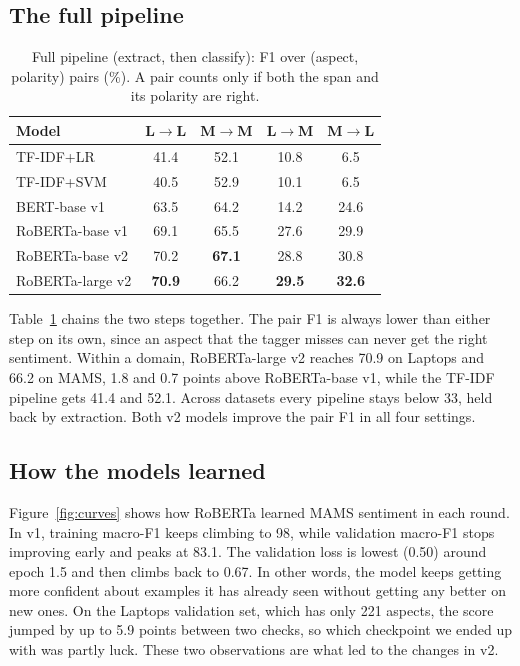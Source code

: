 \documentclass[11pt]{article}
\begin{document}
\subsection{The full pipeline}
\begin{table}[t]
\centering
\footnotesize
\begin{tabular}{lcccc}
\toprule
Model & L$\to$L & M$\to$M & L$\to$M & M$\to$L \\
\midrule
TF-IDF+LR & 41.4 & 52.1 & 10.8 & 6.5 \\
TF-IDF+SVM & 40.5 & 52.9 & 10.1 & 6.5 \\
BERT-base v1 & 63.5 & 64.2 & 14.2 & 24.6 \\
RoBERTa-base v1 & 69.1 & 65.5 & 27.6 & 29.9 \\
RoBERTa-base v2 & 70.2 & \textbf{67.1} & 28.8 & 30.8 \\
RoBERTa-large v2 & \textbf{70.9} & 66.2 & \textbf{29.5} & \textbf{32.6} \\
\bottomrule
\end{tabular}
\caption{Full pipeline (extract, then classify): F1 over (aspect, polarity) pairs (\%). A pair counts only if both the span and its polarity are right.}
\label{tab:e2e}
\end{table}

Table~\ref{tab:e2e} chains the two steps together. The pair F1 is always lower than either step on its own, since an aspect that the tagger misses can never get the right sentiment. Within a domain, RoBERTa-large v2 reaches 70.9 on Laptops and 66.2 on MAMS, 1.8 and 0.7 points above RoBERTa-base v1, while the TF-IDF pipeline gets 41.4 and 52.1. Across datasets every pipeline stays below 33, held back by extraction. Both v2 models improve the pair F1 in all four settings.

\subsection{How the models learned}
Figure~\ref{fig:curves} shows how RoBERTa learned MAMS sentiment in each round. In v1, training macro-F1 keeps climbing to 98, while validation macro-F1 stops improving early and peaks at 83.1. The validation loss is lowest (0.50) around epoch 1.5 and then climbs back to 0.67. In other words, the model keeps getting more confident about examples it has already seen without getting any better on new ones. On the Laptops validation set, which has only 221 aspects, the score jumped by up to 5.9 points between two checks, so which checkpoint we ended up with was partly luck. These two observations are what led to the changes in v2.
\end{document}
